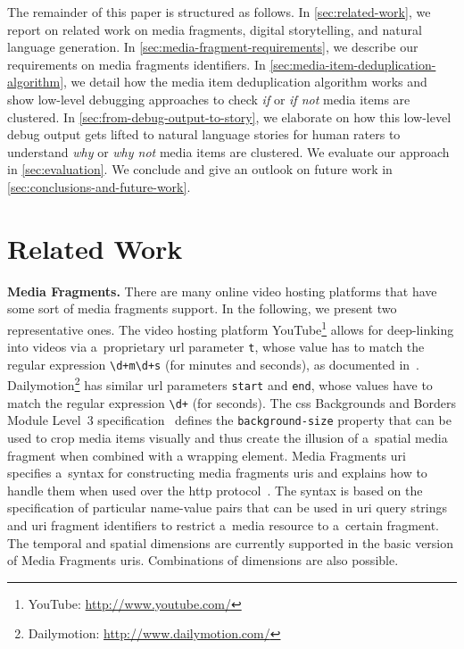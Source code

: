 \documentclass{article}
\begin{document}
The remainder of this paper is structured as follows. In \autoref{sec:related-work}, we report on related work on media fragments, digital storytelling, and natural language generation. In \autoref{sec:media-fragment-requirements}, we describe our requirements on media fragments identifiers. In \autoref{sec:media-item-deduplication-algorithm}, we detail how the media item deduplication algorithm works and show low-level debugging approaches to check
\emph{if} or \emph{if not} media items are clustered. In \autoref{sec:from-debug-output-to-story}, we elaborate on how this low-level debug output gets lifted
to natural language stories for human raters to understand \emph{why} or \emph{why not} media items are clustered. We evaluate our approach in \autoref{sec:evaluation}. We conclude and give an outlook on future work in \autoref{sec:conclusions-and-future-work}.


\section{Related Work}
\label{sec:related-work}
\textbf{Media Fragments.} There are many online video hosting platforms that have some sort of media fragments support. In the following, we present two representative ones. The video hosting platform YouTube\footnote{YouTube: \url{http://www.youtube.com/}} allows for deep-linking into videos via a~proprietary {\sc url} parameter \texttt{t}, whose value has to match the regular expression \texttt{\textbackslash d+m\textbackslash d+s} (for minutes and seconds),
as documented in~\cite{youtube2008link}. Dailymotion\footnote{Dailymotion: \url{http://www.dailymotion.com/}} has similar {\sc url} parameters \texttt{start} and \texttt{end}, whose values have to match the regular expression \texttt{\textbackslash d+} (for seconds). The {\sc css} Backgrounds and Borders Module Level~3 specification~\cite{bos2012css3} defines the \texttt{background-size} property that can be used to crop media items visually and thus create the illusion of a~spatial media fragment when combined with a wrapping element. Media Fragments {\sc uri}~\cite{troncy2012mediafragments} specifies a~syntax for constructing media fragments {\sc uri}s and explains how to handle them when used over the {\sc http} protocol~\cite{fielding1999http}. The syntax is based on the specification of particular name-value pairs that can be used in {\sc uri} query strings and {\sc uri} fragment identifiers to restrict a~media resource to a~certain fragment. The temporal and spatial dimensions are currently supported in the basic version of Media Fragments {\sc uri}s. Combinations of dimensions are also possible.
\end{document}
